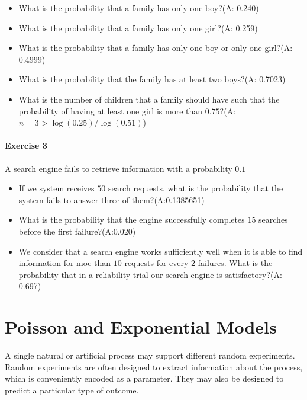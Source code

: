 \documentclass[
]{book}
\providecommand{\tightlist}{%
  \setlength{\itemsep}{0pt}\setlength{\parskip}{0pt}}
\begin{document}
\begin{itemize}
\tightlist
\item
  What is the probability that a family has only one boy?(A: 0.240)
\item
  What is the probability that a family has only one girl?(A: 0.259)
\item
  What is the probability that a family has only one boy or only one girl?(A: 0.4999)
\item
  What is the probability that the family has at least two boys?(A: 0.7023)
\item
  What is the number of children that a family should have such that the probability of having at least one girl is more than \(0.75\)?(A:\(n=3>\log(0.25)/\log(0.51)\))
\end{itemize}

\hypertarget{exercise-3-4}{%
\subsubsection{Exercise 3}\label{exercise-3-4}}

A search engine fails to retrieve information with a probability \(0.1\)

\begin{itemize}
\item
  If we system receives \(50\) search requests, what is the probability that the system fails to answer three of them?(A:0.1385651)
\item
  What is the probability that the engine successfully completes \(15\) searches before the first failure?(A:0.020)
\item
  We consider that a search engine works sufficiently well when it is able to find information for moe than \(10\) requests for every \(2\) failures. What is the probability that in a reliability trial our search engine is satisfactory?(A: 0.697)
\end{itemize}

\hypertarget{poisson-and-exponential-models}{%
\chapter{Poisson and Exponential Models}\label{poisson-and-exponential-models}}

A single natural or artificial process may support different random experiments. Random experiments are often designed to extract information about the process, which is conveniently encoded as a parameter. They may also be designed to predict a particular type of outcome.
\end{document}
